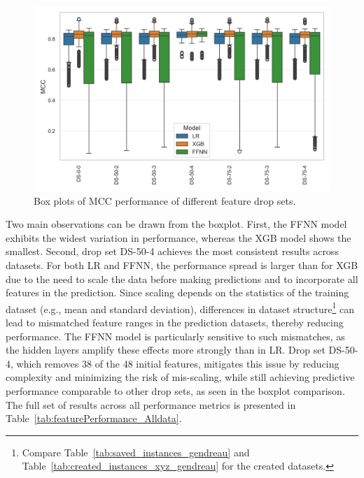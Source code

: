 \begin{figure}[ht]
	\centering
	\includegraphics[width = .85\textwidth]{pictures/feature_filter/all_data_exceptSubsets_box_plot.png}
	\caption{Box plots of MCC performance of different feature drop sets.}
	\label{fig:mcc_filter_results}
\end{figure}
Two main observations can be drawn from the boxplot. First, the \gls{FFNN} model exhibits the widest variation in performance, whereas the XGB model
shows the smallest. Second, drop set DS-50-4 achieves the most consistent results across datasets. For both LR and FFNN, the performance
spread is larger than for XGB due to the need to scale the data before making predictions and to incorporate all features in the prediction.
Since scaling depends on the statistics of
the training dataset (e.g., mean and standard deviation), differences in dataset structure\footnote{Compare Table~\ref{tab:saved_instances_gendreau} and Table~\ref{tab:created_instances_xyz_gendreau} for the created datasets.}
can lead to mismatched feature ranges in the prediction datasets, thereby reducing performance. The \gls{FFNN} model is particularly sensitive
to such mismatches, as the hidden layers amplify these effects more strongly than in LR. Drop set DS-50-4, which removes 38 of
the 48 initial features, mitigates this issue by reducing complexity and minimizing the risk of mis-scaling, while still
achieving predictive performance comparable to other drop sets, as seen in the boxplot comparison. The full set of results across
all performance metrics is presented in Table~\ref{tab:featurePerformance_Alldata}.

